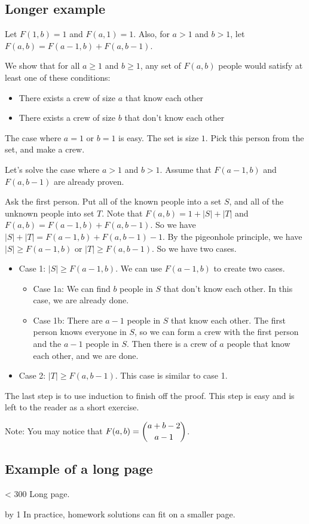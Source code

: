 \documentclass{article}
\begin{document}
\begin{preview}
\section{Longer example}
Let $F(1,b)=1$ and $F(a,1)=1$. Also, for $a>1$ and $b>1$, let $F(a,b) = F(a-1,b) + F(a,b-1)$.

We show that for all $a \ge 1$ and $b \ge 1$, any set of $F(a,b)$ people would satisfy at least one of these conditions:

\begin{itemize}
\item There exists a crew of size $a$ that know each other
\item There exists a crew of size $b$ that don't know each other
\end{itemize}

The case where $a=1$ or $b=1$ is easy. The set is size $1$. Pick this person from the set, and make a crew.

Let's solve the case where $a>1$ and $b>1$. Assume that $F(a-1,b)$ and $F(a,b-1)$ are already proven.

Ask the first person. Put all of the known people into a set $S$, and all of the unknown people into set $T$. Note that $F(a,b) = 1 + |S| + |T|$ and $F(a,b) = F(a-1,b) + F(a,b-1)$. So we have $|S| + |T| = F(a-1,b) + F(a,b-1) - 1$. By the pigeonhole principle, we have $|S| \ge F(a-1,b)$ or $|T| \ge F(a,b-1)$. So we have two cases.

\begin{itemize}
\item Case 1: $|S| \ge F(a-1,b)$. We can use $F(a-1,b)$ to create two cases.
\begin{itemize}
\item Case 1a: We can find $b$ people in $S$ that don't know each other. In this case, we are already done.
\item Case 1b: There are $a-1$ people in $S$ that know each other. The first person knows everyone in $S$, so we can form a crew with the first person and the $a-1$ people in $S$. Then there is a crew of $a$ people that know each other, and we are done.
\end{itemize}

\item Case 2: $|T| \ge F(a,b-1)$. This case is similar to case 1.
\end{itemize}

The last step is to use induction to finish off the proof. This step is easy and is left to the reader as a short exercise.

Note: You may notice that $F(a,b) = \dbinom{a+b-2}{a-1}$.
\end{preview}

\begin{preview}
\section{Example of a long page}
\newcount\linenum
{}
\loop\ifnum\linenum < 300
Long page.

\advance\linenum by 1
\repeat
In practice, homework solutions can fit on a smaller page.
\end{preview}
\end{document}
